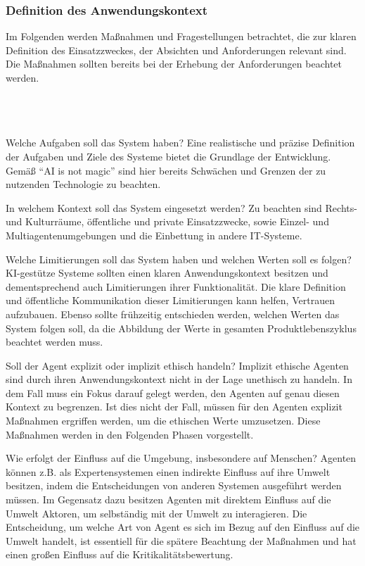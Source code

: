 \subsubsection{Definition des Anwendungskontext}
Im Folgenden werden Maßnahmen und Fragestellungen betrachtet, die zur klaren Definition des Einsatzzweckes, der Absichten und Anforderungen relevant sind.
Die Maßnahmen sollten bereits bei der Erhebung der Anforderungen beachtet werden.
\\\\
\\\\
\begin{qanda}
    \Q Welche Aufgaben soll das System haben? 
    \A Eine realistische und präzise Definition der Aufgaben und Ziele des Systeme bietet die Grundlage der Entwicklung.
    Gemäß \enquote{AI is not magic} \cite[S. 13]{gottesman2018} sind hier bereits Schwächen und Grenzen der zu nutzenden Technologie zu beachten.
    
    \Q In welchem Kontext soll das System eingesetzt werden?
    \A Zu beachten sind Rechts- und Kulturräume, öffentliche und private Einsatzzwecke, sowie Einzel- und Multiagentenumgebungen und die Einbettung in andere IT-Systeme.
    
    \Q Welche Limitierungen soll das System haben und welchen Werten soll es folgen?
    \A KI-gestütze Systeme sollten einen klaren Anwendungskontext besitzen und dementsprechend auch Limitierungen ihrer Funktionalität.
    Die klare Definition und öffentliche Kommunikation dieser Limitierungen kann helfen, Vertrauen aufzubauen.
    Ebenso sollte frühzeitig entschieden werden, welchen Werten das System folgen soll, da die Abbildung der Werte in gesamten Produktlebenszyklus beachtet werden muss.
    
    \Q Soll der Agent explizit oder implizit ethisch handeln?
    \A Implizit ethische Agenten sind durch ihren Anwendungskontext nicht in der Lage unethisch zu handeln. 
    In dem Fall muss ein Fokus darauf gelegt werden, den Agenten auf genau diesen Kontext zu begrenzen.
    Ist dies nicht der Fall, müssen für den Agenten explizit Maßnahmen ergriffen werden, um die ethischen Werte umzusetzen.
    Diese Maßnahmen werden in den Folgenden Phasen vorgestellt.
    
    \Q Wie erfolgt der Einfluss auf die Umgebung, insbesondere auf Menschen?
    \A Agenten können z.B. als Expertensystemen einen indirekte Einfluss auf ihre Umwelt besitzen, indem die Entscheidungen von anderen Systemen ausgeführt werden müssen.
    Im Gegensatz dazu besitzen Agenten mit direktem Einfluss auf die Umwelt Aktoren, um selbständig mit der Umwelt zu interagieren.
    Die Entscheidung, um welche Art von Agent es sich im Bezug auf den Einfluss auf die Umwelt handelt, ist essentiell für die spätere Beachtung der Maßnahmen und hat einen großen Einfluss auf die Kritikalitätsbewertung.
\end{qanda}

